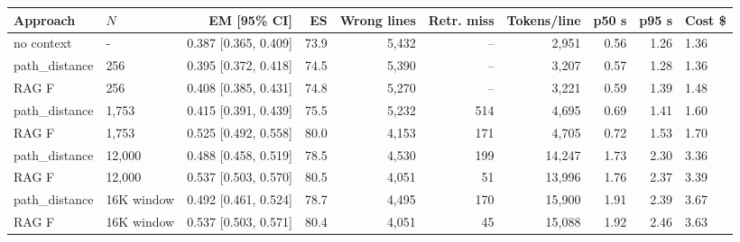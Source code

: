 \begin{tabular}{llrrrrrrr}
\toprule
Approach & $N$ & EM [95\% CI] & ES & Wrong lines & Retr. miss & Tokens/line & p50 s & p95 s & Cost \$ \\
\midrule
no context & - & 0.387 [0.365, 0.409] & 73.9 & 5,432 & -- & 2,951 & 0.56 & 1.26 & 1.36 \\
path\_distance & 256 & 0.395 [0.372, 0.418] & 74.5 & 5,390 & -- & 3,207 & 0.57 & 1.28 & 1.36 \\
RAG F & 256 & 0.408 [0.385, 0.431] & 74.8 & 5,270 & -- & 3,221 & 0.59 & 1.39 & 1.48 \\
path\_distance & 1,753 & 0.415 [0.391, 0.439] & 75.5 & 5,232 & 514 & 4,695 & 0.69 & 1.41 & 1.60 \\
RAG F & 1,753 & 0.525 [0.492, 0.558] & 80.0 & 4,153 & 171 & 4,705 & 0.72 & 1.53 & 1.70 \\
path\_distance & 12,000 & 0.488 [0.458, 0.519] & 78.5 & 4,530 & 199 & 14,247 & 1.73 & 2.30 & 3.36 \\
RAG F & 12,000 & 0.537 [0.503, 0.570] & 80.5 & 4,051 & 51 & 13,996 & 1.76 & 2.37 & 3.39 \\
path\_distance & 16K window & 0.492 [0.461, 0.524] & 78.7 & 4,495 & 170 & 15,900 & 1.91 & 2.39 & 3.67 \\
RAG F & 16K window & 0.537 [0.503, 0.571] & 80.4 & 4,051 & 45 & 15,088 & 1.92 & 2.46 & 3.63 \\
\bottomrule
\end{tabular}
